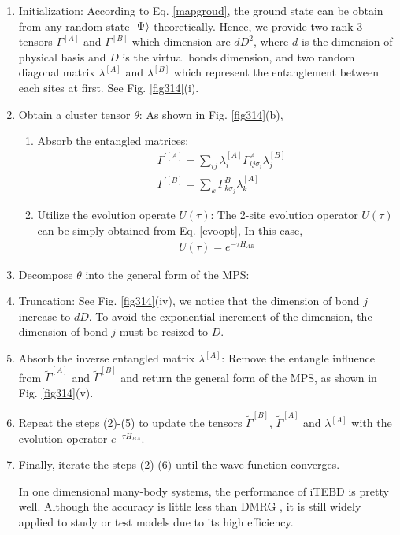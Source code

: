 \begin{enumerate}
		\item Initialization: According to Eq. \ref{mapgroud}, the ground state can be obtain from any random state $\Ket{\Psi}$ theoretically. Hence, we provide two rank-3 tensors $\Gamma^{[A]}$ and $\Gamma^{[B]}$ which dimension are $dD^2$, where $d$ is the dimension of physical basis and $D$ is the virtual bonds dimension, and two random diagonal matrix $\lambda^{[A]}$ and $\lambda^{[B]}$ which represent the entanglement between each sites at first. See Fig. \ref{fig314}(i).
		\item Obtain a cluster tensor $\theta$: As shown in Fig. \ref{fig314}(b),
			\begin{enumerate}
				\item Absorb the entangled matrices; 
					\begin{align}
						&\Gamma^{\prime [A]} = \sum_{ij}{\lambda^{[A]}_{i} \Gamma^{A}_{ij \sigma_i} \lambda^{[B]}_{j}} \\
						&\Gamma^{\prime [B]} = \sum_{k}{\Gamma^{B}_{k \sigma_j} \lambda^{[A]}_{k}}
					\end{align}
						\item Utilize the evolution operate $U(\tau)$: The 2-site evolution operator $U(\tau)$ can be simply obtained from Eq. \ref{evoopt}, In this case, 
							\begin{align}
								U(\tau) = e^{-\tau H_{AB}}
							\end{align}
			\end{enumerate}
		\item Decompose $\theta$ into the general form of the MPS:
		\item Truncation: See Fig. \ref{fig314}(iv), we notice that the dimension of bond $j$ increase to $dD$. To avoid the exponential increment of the dimension, the dimension of bond $j$ must be resized to $D$.
		\item Absorb the inverse entangled matrix $\lambda^{[A]}$: Remove the entangle influence from $\widetilde{\Gamma}^{[A]}$ and $\widetilde{\Gamma}^{[B]}$ and return the general form of the MPS, as shown in Fig. \ref{fig314}(v).
		\item Repeat the steps (2)-(5) to update the tensors $\widetilde{\Gamma}^{[B]}$, $\widetilde{\Gamma}^{[A]}$ and $\lambda^{[A]}$ with the evolution operator $e^{-\tau H_{BA}}$.
		\item Finally, iterate the steps (2)-(6) until the wave function converges.
			
In one dimensional many-body systems, the performance of iTEBD is pretty well. Although the accuracy is little less than DMRG \cite{}, it is still widely applied to study or test models due to its high efficiency.
\end{enumerate}

